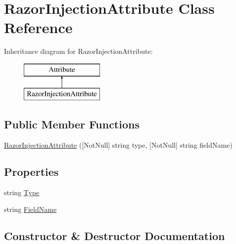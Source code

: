 \hypertarget{class_razor_injection_attribute}{}\section{Razor\+Injection\+Attribute Class Reference}
\label{class_razor_injection_attribute}
Inheritance diagram for Razor\+Injection\+Attribute\+:\begin{figure}[H]
\begin{center}
\leavevmode
\includegraphics[height=2.000000cm]{class_razor_injection_attribute}
\end{center}
\end{figure}
\subsection*{Public Member Functions}
\begin{DoxyCompactItemize}
\item 
\mbox{\hyperlink{class_razor_injection_attribute_a42c2579ffa3c3e861d657946cfc120ad}{Razor\+Injection\+Attribute}} (\mbox{[}Not\+Null\mbox{]} string type, \mbox{[}Not\+Null\mbox{]} string field\+Name)
\end{DoxyCompactItemize}
\subsection*{Properties}
\begin{DoxyCompactItemize}
\item 
string \mbox{\hyperlink{class_razor_injection_attribute_a03ab3ec12db49f3eeca9d462b95bb6fd}{Type}}
\item 
string \mbox{\hyperlink{class_razor_injection_attribute_ace7a81f227c76db0a47cca6edb85a911}{Field\+Name}}
\end{DoxyCompactItemize}


\subsection{Constructor \& Destructor Documentation}
\mbox{\label{class_razor_injection_attribute_a42c2579ffa3c3e861d657946cfc120ad}} 
